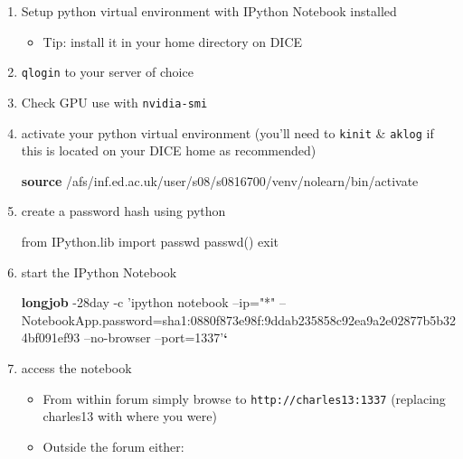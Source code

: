 \documentclass[]{article}
\newenvironment{Shaded}{\begin{snugshade}}{\end{snugshade}}
\newcommand{\KeywordTok}[1]{\textcolor[rgb]{0.13,0.29,0.53}{\textbf{{#1}}}}
\newcommand{\CharTok}[1]{\textcolor[rgb]{0.31,0.60,0.02}{{#1}}}
\newcommand{\StringTok}[1]{\textcolor[rgb]{0.31,0.60,0.02}{{#1}}}
\newcommand{\NormalTok}[1]{{#1}}
\begin{document}
\begin{enumerate}
\def\labelenumi{\arabic{enumi}.}
\item
  Setup python virtual environment with IPython Notebook installed

  \begin{itemize}
  \itemsep1pt\parskip0pt
  \item
    Tip: install it in your home directory on DICE
  \end{itemize}
\item
  \texttt{qlogin} to your server of choice
\item
  Check GPU use with \texttt{nvidia-smi}
\item
  activate your python virtual environment (you'll need to
  \texttt{kinit} \& \texttt{aklog} if this is located on your DICE home
  as recommended)

\begin{Shaded}
\begin{Highlighting}[]
\KeywordTok{source} \NormalTok{/afs/inf.ed.ac.uk/user/s08/s0816700/venv/nolearn/bin/activate}
\end{Highlighting}
\end{Shaded}
\item
  create a password hash using python

\begin{Shaded}
\begin{Highlighting}[]
\CharTok{from} \NormalTok{IPython.lib }\CharTok{import} \NormalTok{passwd}
\NormalTok{passwd()}
\NormalTok{exit}
\end{Highlighting}
\end{Shaded}
\item
  start the IPython Notebook

\begin{Shaded}
\begin{Highlighting}[]
\KeywordTok{longjob} \NormalTok{-28day -c }\StringTok{'ipython notebook  --ip="*" --NotebookApp.password=sha1:0880f873e98f:9ddab235858c92ea9a2e02877b5b324bf091ef93 --no-browser --port=1337'}\KeywordTok{`}
\end{Highlighting}
\end{Shaded}
\item
  access the notebook

  \begin{itemize}
  \itemsep1pt\parskip0pt
  \item
    From within forum simply browse to \texttt{http://charles13:1337}
    (replacing charles13 with where you were)
  \item
    Outside the forum either:


\end{itemize}
\end{enumerate}
\end{document}
